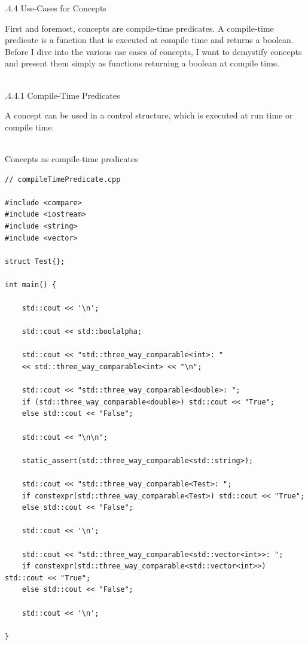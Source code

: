 .4.4\hspace{0.2cm} Use-Cases for Concepts

First and foremost, concepts are compile-time predicates. A compile-time predicate is a function that is executed at compile time and returns a boolean. Before I dive into the various use cases of concepts, I want to demystify concepts and present them simply as functions returning a boolean at compile time.

\hspace*{\fill} \\ %
.4.4.1\hspace{0.2cm} Compile-Time Predicates

A concept can be used in a control structure, which is executed at run time or compile time.

\hspace*{\fill} \\ %
\noindent
Concepts as compile-time predicates
\begin{lstlisting}[style=styleCXX]
// compileTimePredicate.cpp

#include <compare>
#include <iostream>
#include <string>
#include <vector>

struct Test{};

int main() {

	std::cout << '\n';
	
	std::cout << std::boolalpha;
	
	std::cout << "std::three_way_comparable<int>: "
	<< std::three_way_comparable<int> << "\n";
	
	std::cout << "std::three_way_comparable<double>: ";
	if (std::three_way_comparable<double>) std::cout << "True";
	else std::cout << "False";
	
	std::cout << "\n\n";
	
	static_assert(std::three_way_comparable<std::string>);
	
	std::cout << "std::three_way_comparable<Test>: ";
	if constexpr(std::three_way_comparable<Test>) std::cout << "True";
	else std::cout << "False";
	
	std::cout << '\n';
	
	std::cout << "std::three_way_comparable<std::vector<int>>: ";
	if constexpr(std::three_way_comparable<std::vector<int>>) std::cout << "True";
	else std::cout << "False";
	
	std::cout << '\n';

}
\end{lstlisting}

